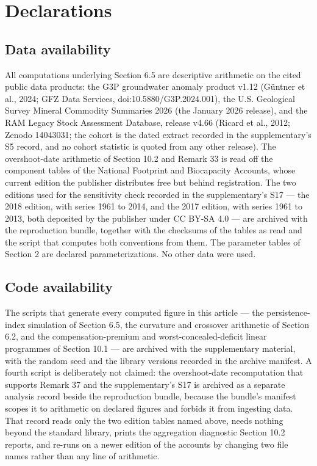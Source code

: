 \documentclass[11pt]{article}
\begin{document}
\section*{Declarations}

\subsection*{Data availability}

All computations underlying Section 6.5 are descriptive arithmetic on
the cited public data products: the G3P groundwater anomaly product
v1.12 (G\"untner et al., 2024; GFZ Data Services,
doi:10.5880/G3P.2024.001), the U.S. Geological Survey Mineral Commodity
Summaries 2026 (the January 2026 release), and the RAM Legacy Stock Assessment Database, release v4.66 (Ricard et al., 2012; Zenodo 14043031; the cohort is the
dated extract recorded in the supplementary's S5 record, and no cohort statistic is quoted from any other release). The overshoot-date arithmetic of Section 10.2 and Remark 33 is read off the component tables of the National Footprint and Biocapacity Accounts, whose current edition the publisher distributes free but behind registration. The two editions used for the sensitivity check recorded in the supplementary's S17 --- the 2018 edition, with series 1961 to 2014, and the 2017 edition, with series 1961 to 2013, both deposited by the publisher under CC BY-SA 4.0 --- are archived with the reproduction bundle, together with the checksums of the tables as read and the script that computes both conventions from them. The parameter tables of Section 2 are declared parameterizations. No other data were used.

\subsection*{Code availability}
The scripts that generate every computed figure in this article --- the persistence-index simulation of Section 6.5, the curvature and crossover arithmetic of Section 6.2, and the compensation-premium and worst-concealed-deficit linear programmes of Section 10.1 --- are archived with the supplementary material, with the random seed and the library versions recorded in the archive manifest. A fourth script is deliberately not claimed: the overshoot-date recomputation that supports Remark 37 and the supplementary's S17 is archived as a separate analysis record beside the reproduction bundle, because the bundle's manifest scopes it to arithmetic on declared figures and forbids it from ingesting data. That record reads only the two edition tables named above, needs nothing beyond the standard library, prints the aggregation diagnostic Section 10.2 reports, and re-runs on a newer edition of the accounts by changing two file names rather than any line of arithmetic.
\end{document}
